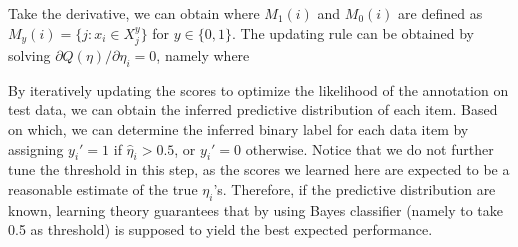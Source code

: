 Take the derivative, we can obtain
%
where $M_1(i)$ and $M_0(i)$ are defined as $M_y(i) = \{j:x_i \in X_j^y\}$ for $y \in \{0, 1\}$.
The updating rule can be obtained by solving $\partial Q(\eta) / \partial \eta_i = 0$, namely
where

By iteratively updating the scores to optimize the likelihood of the annotation on test data,
we can obtain the inferred predictive distribution of each item.
Based on which, we can determine the inferred binary label for each data item by assigning $y_i'=1$ if $\hat{\eta}_i > 0.5$,
or $y_i'=0$ otherwise.
Notice that we do not further tune the threshold in this step,
as the scores we learned here are expected to be a reasonable estimate of the true $\eta_i$'s.
Therefore, if the predictive distribution are known,
learning theory guarantees that by using Bayes classifier (namely to take 0.5 as threshold)
is supposed to yield the best expected performance.




